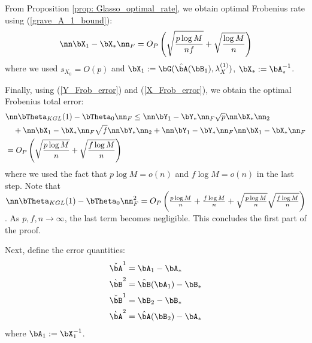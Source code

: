 \begin{IEEEproof}
From Proposition \ref{prop: Glasso_optimal_rate}, we obtain optimal Frobenius rate using (\ref{grave_A_1_bound}):
\begin{equation} \label{X_Frob_error}
	\nn \bX_1-\bX_* \nn_F = O_P\left( \sqrt{ \frac{p\log M}{nf}} + \sqrt{\frac{\log M}{n}} \right)
\end{equation}
where we used $s_{X_0}=O(p)$ and $\bX_1:=\bG(\hat{\bA}(\bB_1), \lambda_X^{(1)})$, $\bX_*:=\bA_*^{-1}$.

Finally, using (\ref{Y_Frob_error}) and (\ref{X_Frob_error}), we obtain the optimal Frobenius total error:
\begin{align}
	& \nn \bTheta_{KGL}(1)-\bTheta_0 \nn_F \leq \nn \bY_1-\bY_*\nn_F \sqrt{p} \nn \bX_*\nn_2  \nonumber \\
		&\quad + \nn \bX_1-\bX_*\nn_F \sqrt{f} \nn \bY_*\nn_2 + \nn \bY_1-\bY_*\nn_F \nn \bX_1-\bX_*\nn_F \label{total_error} \\
		&=O_P\left( \sqrt{\frac{p\log M}{n}} + \sqrt{\frac{f\log M}{n}} \right) \nonumber
\end{align}
where we used the fact that $p \log M=o(n)$ and $f\log M=o(n)$ in the last step. Note that $\nn \bTheta_{KGL}(1)-\bTheta_0 \nn_F^2 = O_P\left( \frac{p\log M}{n} + \frac{f\log M}{n} + \sqrt{\frac{p\log M}{n}} \sqrt{\frac{f\log M}{n}} \right)$. As $p,f,n\to\infty$, the last term becomes negligible. This concludes the first part of the proof.

Next, define the error quantities:
\begin{align*}
	\check{\bA}^1 &= \bA_1 - \bA_* \\
	\grave{\bB}^2 &= \hat{\bB}(\bA_1) - \bB_* \\
	\check{\bB}^1 &= \bB_2 - \bB_* \\
	\grave{\bA}^2 &= \hat{\bA}(\bB_2) - \bA_*
\end{align*}
where $\bA_1 := \bX_1^{-1}$.


\end{IEEEproof}
